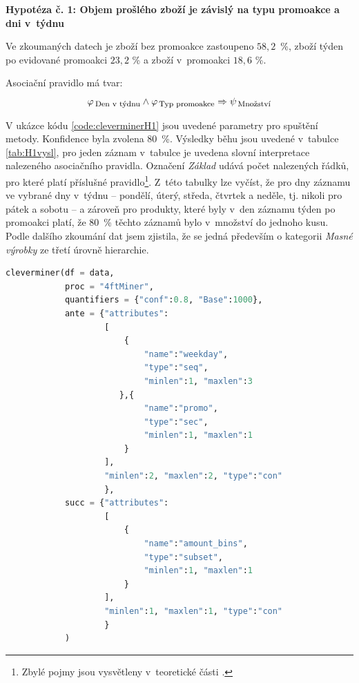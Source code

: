 \vspace*{1em}

\textbf{Hypotéza č. 1: Objem prošlého zboží je závislý na typu promoakce a dni v~týdnu}

Ve zkoumaných datech je zboží bez promoakce zastoupeno $58{,}2$~\%, zboží týden po evidované promoakci $23{,}2$ \% a zboží v~promoakci $18{,}6$ \%. 

Asociační pravidlo má tvar:
\begin{equation}
    \varphi_{\mbox{\,\footnotesize Den v~týdnu}} \land \varphi_{\,\mbox{\footnotesize Typ promoakce}} \Rightarrow \psi_{\mbox{\,\footnotesize Množství}}
\end{equation}

V ukázce kódu \ref*{code:cleverminerH1} jsou uvedené parametry pro spuštění metody. Konfidence byla zvolena 80~\%. Výsledky běhu jsou uvedené v~tabulce \ref*{tab:H1vysl}, pro jeden záznam v~tabulce je uvedena slovní interpretace nalezeného asociačního pravidla. Označení \emph{Základ} udává počet nalezených řádků, pro které platí příslušné pravidlo\footnote{Zbylé pojmy jsou vysvětleny v~teoretické části \label{sec:clever:pojmy}.}.  Z~této tabulky lze vyčíst, že pro dny záznamu ve vybrané dny v~týdnu -- pondělí, úterý, středa, čtvrtek a neděle, tj. nikoli pro pátek a sobotu -- a zároveň pro produkty, které byly v~den záznamu týden po promoakci platí, že 80~\% těchto záznamů bylo v~množství do jednoho kusu. Podle dalšího zkoumání dat jsem zjistila, že se jedná především o kategorii \emph{Masné výrobky} ze třetí úrovně hierarchie.

\begin{lstlisting}[language=Python, style=mystyle, label={code:cleverminerH1}, caption={Hypotéza č. 1, funkce \texttt{cleverminer}.}]
cleverminer(df = data,
            proc = "4ftMiner", 
            quantifiers = {"conf":0.8, "Base":1000},
            ante = {"attributes":
                    [
                        {
                            "name":"weekday", 
                            "type":"seq", 
                            "minlen":1, "maxlen":3
                       },{
                            "name":"promo", 
                            "type":"sec", 
                            "minlen":1, "maxlen":1
                        }
                    ], 
                    "minlen":2, "maxlen":2, "type":"con"
                    },
            succ = {"attributes":
                    [
                        {
                            "name":"amount_bins", 
                            "type":"subset", 
                            "minlen":1, "maxlen":1
                        }
                    ], 
                    "minlen":1, "maxlen":1, "type":"con"
                    }
            )
    \end{lstlisting}

